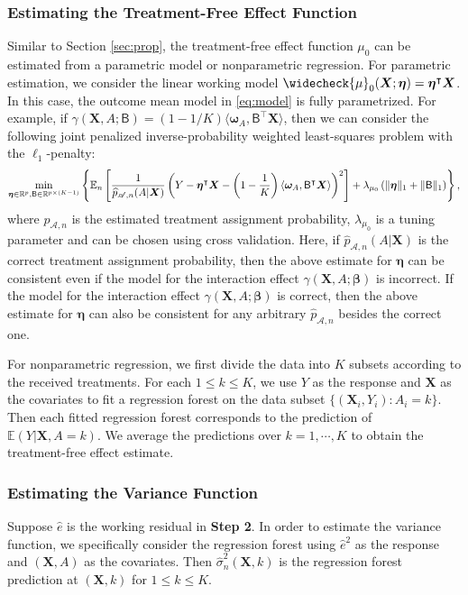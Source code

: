 \documentclass[11pt]{article}
\theoremstyle{definition}
\theoremstyle{remark}
\newcommand{\bX}{\bm{X}}
\newcommand{\bbeta}{\bm{\beta}}
\newcommand{\bmeta}{\bm{\eta}}
\newcommand{\bomega}{\bm{\omega}}
\newcommand{\bbE}{\mathbb{E}}
\newcommand{\bbR}{\mathbb{R}}
\newcommand{\sA}{\mathscr{A}}
\newcommand{\sfB}{\mathsf{B}}
\begin{document}
\subsubsection{Estimating the Treatment-Free Effect Function}\label{sec:tf}
Similar to Section \ref{sec:prop}, the treatment-free effect function $ \mu_{0} $ can be estimated from a parametric model or nonparametric regression. For parametric estimation, we consider the linear working model $ \widecheck{\mu}_{0}(\bX;\bmeta) = \bmeta^{\intercal}\bX $. In this case, the outcome mean model in \eqref{eq:model} is fully parametrized. For example, if $ \gamma(\bX,A;\sfB) = (1-1/K)\langle \bomega_{A},\sfB^{\intercal}\bX \rangle $, then we can consider the following joint penalized inverse-probability weighted least-squares problem with the $ \ell_{1} $-penalty:
\[ \min_{\bmeta \in \bbR^{p},\sfB \in \bbR^{p\times(K-1)}} \left\{ \bbE_{n}\left[ {1 \over \widehat{p}_{\sA,n}(A|\bX)}\left( Y - \bmeta^{\intercal}\bX - \left( 1 - {1 \over K} \right)\langle \bomega_{A},\sfB^{\intercal}\bX \rangle \right)^{2} \right] + \lambda_{\mu_{0}}\left( \| \bmeta \|_{1} + \| \sfB \|_{1} \right) \right\}, \]
where $ \widehat{p}_{\sA,n} $ is the estimated treatment assignment probability, $ \lambda_{\mu_{0}} $ is a tuning parameter and can be chosen using cross validation. Here, if $ \widehat{p}_{\sA,n}(A|\bX) $ is the correct treatment assignment probability, then the above estimate for $ \bmeta $ can be consistent even if the model for the interaction effect $ \gamma(\bX,A;\bbeta) $ is incorrect. If the model for the interaction effect $ \gamma(\bX,A;\bbeta) $ is correct, then the above estimate for $ \bmeta $ can also be consistent for any arbitrary $ \widehat{p}_{\sA,n} $ besides the correct one. 

For nonparametric regression, we first divide the data into $ K $ subsets according to the received treatments. For each $ 1 \le k \le K $, we use $ Y $ as the response and $ \bX $ as the covariates to fit a regression forest on the data subset $ \{ (\bX_{i},Y_{i}): A_{i} = k \} $. Then each fitted regression forest corresponds to the prediction of $ \bbE(Y|\bX,A = k) $. We average the predictions over $ k = 1,\cdots,K $ to obtain the treatment-free effect estimate.

\subsubsection{Estimating the Variance Function}\label{sec:var}
Suppose $ \widehat{e} $ is the working residual in \textbf{Step 2}. In order to estimate the variance function, we specifically consider the regression forest using $ \widehat{e}^{2} $ as the response and $ (\bX,A) $ as the covariates. Then $ \widehat{\sigma}_{n}^{2}(\bX,k) $ is the regression forest prediction at $ (\bX,k) $ for $ 1 \le k \le K $. 
\end{document}
